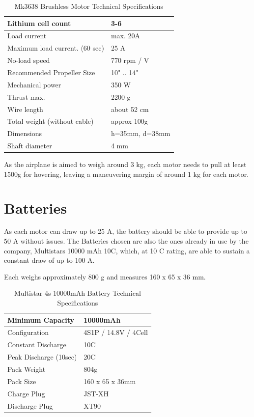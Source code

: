 \begin{table}[H]
\centering
\begin{tabular}{|l|l|}
\hline
Lithium cell count 					& 3-6 \\ \hline
Load current      					& max. 20A \\ \hline
Maximum load current. (60 sec)		& 25 A \\ \hline
No-load speed 						& 770 rpm / V \\ \hline
Recommended Propeller Size 			& 10" .. 14" \\ \hline
Mechanical power					& 350 W \\ \hline
Thrust max.							& 2200 g \\ \hline
Wire length							& about 52 cm \\ \hline
Total weight (without cable)		& approx 100g \\ \hline
Dimensions							& h=35mm, d=38mm \\ \hline
Shaft diameter						& 4 mm \\ \hline
\end{tabular}
\caption{Mk3638 Brushless Motor Technical Specifications}\label{tab:mk3638}
\end{table}

As the airplane is aimed to weigh around 3 kg, each motor needs to pull at least 1500g for hovering, leaving a maneuvering margin of around 1 kg for each motor.

\section{Batteries}

As each motor can draw up to 25 A, the battery should be able to provide up to 50 A without issues.
The Batteries chosen are also the ones already in use by the company, Multistars 10000 mAh 10C, which, at 10 C rating, are able to sustain a constant draw of up to 100 A. 

Each weighs approximately 800 g and measures 160 x 65 x 36 mm.



\begin{table}[h]
\centering
\caption{Multistar 4s 10000mAh Battery Technical Specifications}
\label{tab:multistar}
\begin{tabular}{|l|l|}
\hline
Minimum Capacity		& 10000mAh \\ \hline
Configuration			& 4S1P / 14.8V / 4Cell \\ \hline
Constant Discharge		& 10C \\ \hline
Peak Discharge (10sec)	& 20C \\ \hline
Pack Weight				& 804g \\ \hline
Pack Size				& 160 x 65 x 36mm \\ \hline
Charge Plug				& JST-XH \\ \hline
Discharge Plug			& XT90 \\ \hline
\end{tabular}
\end{table}

